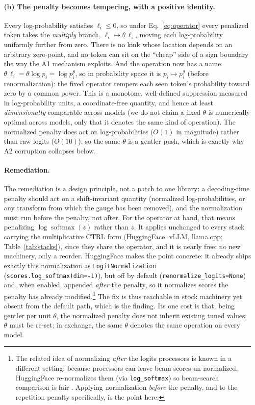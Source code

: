\documentclass[11pt]{article}
\newcommand{\thp}{\theta}
\newcommand{\softmax}{\operatorname{softmax}}
\newcommand{\code}[1]{\texttt{#1}}
\begin{document}
\paragraph{(b) The penalty becomes tempering, with a positive identity.} Every log-probability
satisfies $\ell_i \le 0$, so under Eq.~\eqref{eq:operator} every penalized token takes the
\emph{multiply} branch, $\ell_i \mapsto \thp\,\ell_i$, moving each log-probability uniformly
further from zero. There is no kink whose location depends on an arbitrary zero-point, and no
token can sit on the ``cheap'' side of a sign boundary the way the A1 mechanism exploits. And
the operation now has a name: $\thp\,\ell_i = \thp\log p_i = \log p_i^{\thp}$, so in probability
space it is $p_i \mapsto p_i^{\thp}$ (before renormalization): the fixed operator
tempers each seen token's probability toward zero by a common power. This is a
monotone, well-defined
suppression measured in log-probability units, a coordinate-free quantity, and hence at least
\emph{dimensionally} comparable across models (we do not claim a fixed $\thp$ is numerically
optimal across models, only that it denotes the same kind of operation). The normalized penalty does act on
log-probabilities ($O(1)$ in magnitude) rather than raw logits ($O(10)$), so the same $\thp$ is
a gentler push, which is exactly why A2 corruption collapses below.

\paragraph{Remediation.} The remediation is a design principle, not a patch to one library:
a decoding-time penalty should act on a shift-invariant quantity (normalized
log-probabilities, or any transform from which the gauge has been removed), and the
normalization must run before the penalty, not after. For the operator at hand, that means
penalizing $\log\softmax(z)$ rather than $z$. It applies unchanged to every stack carrying the
multiplicative CTRL form (HuggingFace, vLLM, llama.cpp; Table~\ref{tab:stacks}), since they
share the operator, and it is nearly free: no new machinery, only a reorder. HuggingFace makes
the point concrete: it already ships exactly this normalization as \code{LogitNormalization}
(\code{scores.log\_softmax(dim=-1)}), but off by default (\code{renormalize\_logits=None}) and,
when enabled, appended \emph{after} the penalty, so it normalizes scores the penalty has already
modified.\footnote{The related idea of normalizing \emph{after} the logits processors is known in a
different setting: because processors can leave beam scores un-normalized, HuggingFace
re-normalizes them (via \code{log\_softmax}) so beam-search comparison is fair \citep{hf10638}.
Applying normalization \emph{before} the penalty, and to the repetition penalty specifically, is
the point here.} The
fix is thus reachable in stock machinery yet absent from the default path, which is the finding.
Its one cost is that, being gentler per unit $\thp$, the normalized penalty does not inherit
existing tuned values: $\thp$ must be re-set; in exchange, the same $\thp$ denotes the same
operation on every model.
\end{document}
